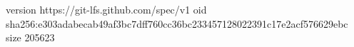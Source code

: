 version https://git-lfs.github.com/spec/v1
oid sha256:e303adabecab49af3bc7dff760cc36bc233457128022391c17e2acf576629ebc
size 205623
